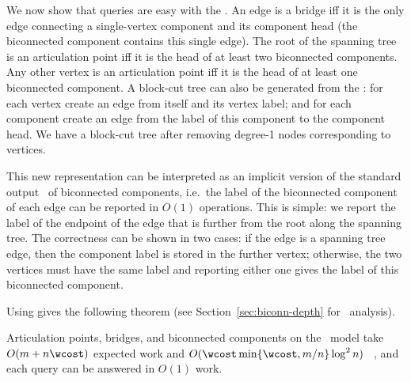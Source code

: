   We now show that queries are easy with the \imprep{}.
An edge is a bridge iff it is the only edge connecting a single-vertex component and its component head (the biconnected component contains this single edge).
The root of the spanning tree is an articulation point iff it is the head of at least two biconnected components. Any other vertex is an articulation point iff it is the head of at least one biconnected component.
A block-cut tree can also be generated from the \imprep{}: for each vertex create an edge from itself and its vertex label; and for each component create an edge from the label of this component to the component head.  We have a block-cut tree after removing degree-1 nodes corresponding to vertices.

This new representation can be interpreted as an implicit version of the standard
output~\cite{CLRS,JaJa92} of biconnected components,
i.e.\ the label of the biconnected component of each edge can be
reported in $O(1)$ operations.
This is simple: we report the label of the endpoint of the edge that is further from the root along the spanning tree.
The correctness can be shown in two cases: if the edge is a spanning tree edge, then the component label is stored in the further vertex; otherwise, the two vertices must have the same label and reporting either one gives the label of this biconnected component.

\bigskip Using \imprep{} gives the following theorem (see Section~\ref{sec:biconn-depth} for \depth\ analysis).
\begin{theorem}\label{thm:biconn-linear}
Articulation points, bridges, and biconnected components on the \ourmodel\ model take $O(m+n\wcost)$ expected work and $O(\wcost\min\{\wcost,m/n\}\log^2 n)$ \depth\ \whp{}, and each query can be answered in $O(1)$ work.
\end{theorem}

